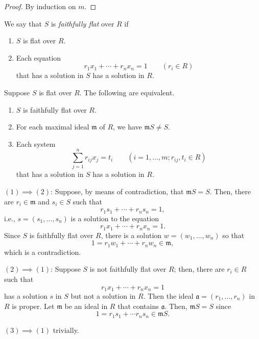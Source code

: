 \begin{proof} By induction on $m$.  \end{proof}

\begin{definition} We say that $S$ is \textit{faithfully flat} over $R$ if
\begin{enumerate}%
\item $S$ is flat over $R$.
\item Each equation 
$$r_1x_1+\cdots +r_nx_n=1 \qquad (r_i\in R)$$
that has a solution in $S$ has a solution in $R$. \end{enumerate}
\end{definition}

\begin{lemma} Suppose $S$ is flat over $R$.  The following are equivalent.
\begin{enumerate}[(1)]
\item $S$ is faithfully flat over $R$.
\item For each maximal ideal $\mathfrak{m}$ of $R$, we have $\mathfrak{m}S\neq S$.
\item Each system 
\begin{equation} \sum_{j=1}^n r_{ij}x_j = t_i \qquad (i=1, \dots, m ; r_{ij}, t_i\in R) \tag{$*$} \end{equation}
that has a solution in $S$ has a solution in $R$. 
\end{enumerate} \end{lemma}

$(1)\implies(2)$: Suppose, by means of contradiction, that $\mathfrak{m}S=S$.  Then, there are $r_i\in \mathfrak{m}$ and $s_i\in S$ such that
$$r_1s_1+\cdots + r_n s_n = 1,$$
i.e., $s=(s_1, \dots, s_n)$ is a solution to the equation
$$r_1x_1 + \cdots + r_n x_n = 1.$$
Since $S$ is faithfully flat over $R$, there is a solution $w=(w_1, \dots, w_n)$ so that
$$1= r_1w_1+\cdots + r_n w_n \in \mathfrak{m},$$
which is a contradiction. 

$(2)\implies (1)$:  Suppose $S$ is not faithfully flat over $R$; then, there are $r_i\in R$ such that
$$r_1x_1+\cdots + r_n x_n=1$$
has a solution $s$ in $S$ but not a solution in $R$.  Then the ideal $\mathfrak{a}=(r_1, \dots, r_n)$ in $R$ is proper.  Let $\mathfrak{m}$ be an ideal in $R$ that contains $\mathfrak{a}$. Then, $\mathfrak{m}S=S$ since
$$1=r_1s_1+\cdots r_n s_n \in \mathfrak{m}S.$$

$(3)\implies (1)$ trivially.


